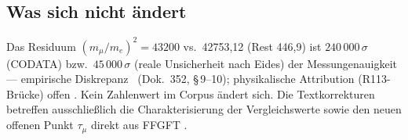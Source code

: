 \subsection*{Was sich nicht ändert}

Das Residuum $(m_\mu/m_e)^2 = 43200$ vs.\ 42753{,}12 (Rest 446{,}9) ist
$240\,000\,\sigma$ (CODATA) bzw.\ $45\,000\,\sigma$ (reale Unsicherheit nach Eides) der Messungenauigkeit --- empirische Diskrepanz \KM\ (Dok.~352, §\,9--10); physikalische Attribution (R113-Brücke) offen \SM. Kein Zahlenwert
im Corpus ändert sich. Die Textkorrekturen betreffen ausschließlich die Charakterisierung
der Vergleichswerte sowie den neuen offenen Punkt $\tau_\mu$ direkt aus FFGFT \SM.

